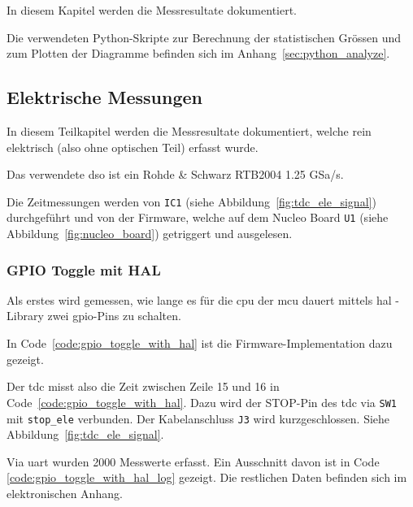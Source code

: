 In diesem Kapitel werden die Messresultate dokumentiert.

Die verwendeten Python-Skripte zur Berechnung der statistischen Grössen und zum Plotten der Diagramme befinden sich im
Anhang~\ref{sec:python_analyze}.

\subsection{Elektrische Messungen}\label{sec:electrical_measurements}

In diesem Teilkapitel werden die Messresultate dokumentiert, welche rein elektrisch (also ohne optischen Teil) erfasst
wurde.

Das verwendete \acrfull{dso} ist ein Rohde \& Schwarz RTB2004 1.25 GSa/s.

Die Zeitmessungen werden von \lstinline|IC1| (siehe Abbildung~\ref{fig:tdc_ele_signal}) durchgeführt und von der
Firmware, welche auf dem Nucleo Board \lstinline|U1| (siehe Abbildung~\ref{fig:nucleo_board}) getriggert und ausgelesen.

\subsubsection{GPIO Toggle mit HAL}\label{sec:gpio_toggle_with_hal}

Als erstes wird gemessen, wie lange es für die \acrshort{cpu} der \acrshort{mcu} dauert mittels \acrfull{hal} - Library
\cite{st2020stm32f0_hal} zwei \acrshort{gpio}-Pins zu schalten.

In Code~\ref{code:gpio_toggle_with_hal} ist die Firmware-Implementation dazu gezeigt.



Der \acrshort{tdc} misst also die Zeit zwischen Zeile 15 und 16 in Code~\ref{code:gpio_toggle_with_hal}. Dazu wird der
STOP-Pin des \acrshort{tdc} via \lstinline|SW1| mit \lstinline|stop_ele| verbunden. Der Kabelanschluss \lstinline|J3|
wird kurzgeschlossen. Siehe Abbildung~\ref{fig:tdc_ele_signal}.

Via \acrshort{uart} wurden 2000 Messwerte erfasst. Ein Ausschnitt davon ist in Code \ref{code:gpio_toggle_with_hal_log}
gezeigt. Die restlichen Daten befinden sich im elektronischen Anhang.



